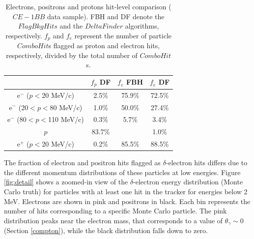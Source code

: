     \begin{center}
    \begin{table}[h!]
    \centering
    \renewcommand{\arraystretch}{1.}
    \begin{tabular}{| c | c | c | c |} 
    \hline
   &  $f_{p}$ DF & $f_{e}$ FBH  & $f_{e}$ DF \\
    \hline
    e$^-$ ($p<$20 MeV/c)     & 2.5\%   & 75.9\% & 72.5\%\\
    \hline
    e$^-$ (20$<p<$80 MeV/c)  & 1.0\%   & 50.0\%& 27.4\%\\
    \hline
    e$^-$ (80$<p<$110 MeV/c)   & 0.3\%  &  5.7\%& 3.4\%\\
    \hline
    $p$                 &         83.7\%   &  & 1.0\%\\
    \hline
    e$^+$ ($p<$20 MeV/c)    & 0.2\%    &   85.5\%& 88.5\%\\
    \hline
    \end{tabular}
    \caption{Electrons, 
    positrons and protons hit-level 
    comparison ($CE-1BB$ data sample). 
    FBH and DF denote the $FlagBkgHits$
    and the $DeltaFinder$ 
    algorithms, respectively. $f_p$ and 
    $f_e$ represent 
    the number of particle $ComboHit$s 
    flagged as proton and electron hits, respectively, 
    divided by the total number of $ComboHit$s.}
    \label{tab:1bbcele}
    \end{table}
  \end{center}

  
The fraction of electron and positron hits 
flagged as $\delta$-electron hits differs due to the different momentum distributions  
of these particles at low energies. Figure \ref{fig:detail} shows a zoomed-in view of the 
$\delta$-electron energy distribution (Monte Carlo truth) for particles with  
at least one hit in the tracker for energies below 2 MeV. 
Electrons are shown in pink and positrons in black. 
Each bin represents the number of hits corresponding to a 
specific Monte Carlo particle. The pink distribution peaks 
near the electron mass, that corresponds to a value of $\theta_\gamma \sim 0$ (Section \ref{compton}), 
while the black distribution falls down to zero. 

